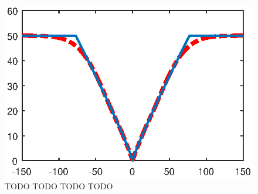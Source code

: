 \documentclass[10pt,twocolumn,letterpaper]{article}
\begin{document}
\begin{figure}[t]
\begin{center}
   \includegraphics[width=0.8\linewidth]{figs/penalty_GenCharbonnier.eps}
\end{center}
   \caption{TODO TODO TODO TODO}
\label{fig:structure}
\end{figure}


\lipsum

{\small
 

}
\end{document}
